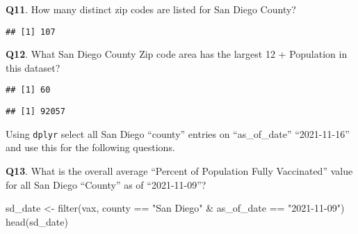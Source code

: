 \documentclass[
]{article}
\newenvironment{Shaded}{\begin{snugshade}}{\end{snugshade}}
\newcommand{\DecValTok}[1]{\textcolor[rgb]{0.00,0.00,0.81}{#1}}
\newcommand{\FunctionTok}[1]{\textcolor[rgb]{0.00,0.00,0.00}{#1}}
\newcommand{\NormalTok}[1]{#1}
\newcommand{\OtherTok}[1]{\textcolor[rgb]{0.56,0.35,0.01}{#1}}
\newcommand{\SpecialCharTok}[1]{\textcolor[rgb]{0.00,0.00,0.00}{#1}}
\newcommand{\StringTok}[1]{\textcolor[rgb]{0.31,0.60,0.02}{#1}}
\begin{document}
\textbf{Q11}. How many distinct zip codes are listed for San Diego
County?

\begin{Shaded}
\end{Shaded}

\begin{verbatim}
## [1] 107
\end{verbatim}

\textbf{Q12}. What San Diego County Zip code area has the largest 12 +
Population in this dataset?

\begin{Shaded}
\end{Shaded}

\begin{verbatim}
## [1] 60
\end{verbatim}

\begin{Shaded}
\end{Shaded}

\begin{verbatim}
## [1] 92057
\end{verbatim}

Using \texttt{dplyr} select all San Diego ``county'' entries on
``as\_of\_date'' ``2021-11-16'' and use this for the following
questions.

\textbf{Q13}. What is the overall average ``Percent of Population Fully
Vaccinated'' value for all San Diego ``County'' as of ``2021-11-09''?

\begin{Shaded}
\begin{Highlighting}[]
\NormalTok{sd\_date }\OtherTok{\textless{}{-}} \FunctionTok{filter}\NormalTok{(vax, county }\SpecialCharTok{==} \StringTok{"San Diego"} \SpecialCharTok{\&}\NormalTok{ as\_of\_date }\SpecialCharTok{==} \StringTok{"2021{-}11{-}09"}\NormalTok{)}
\FunctionTok{head}\NormalTok{(sd\_date)}
\end{Highlighting}
\end{Shaded}
\end{document}
